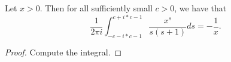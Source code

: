 \begin{lemma}[residueAtNegOne]
\label{residueAtNegOne}
\leanok
Let $x>0$. Then for all sufficiently small $c>0$, we have that
  $$
  \frac1{2\pi i}
  \int_{-c-i*c-1}^{c+ i*c-1}\frac{x^s}{s(s+1)}ds = -\frac1x.
  $$
\end{lemma}
\begin{proof}
\leanok
Compute the integral.
\end{proof}
